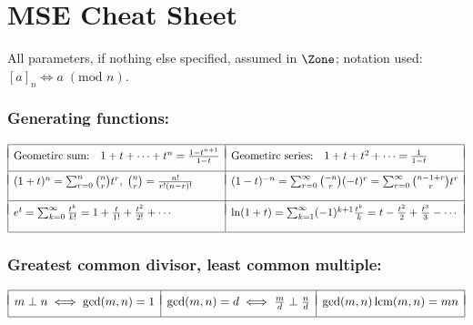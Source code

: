 \documentclass[a4paper]{article}
\begin{document}
\section*{MSE Cheat Sheet}

All parameters, if nothing else specified, assumed in $\Zone$;
notation used: $[a]_n \iff a\; (\mbox{mod } n)$.

\vspace{-10pt}

\subsubsection*{Generating functions:} \vspace{-1.2em}%
\[
  \begin{array}[t]{|ll|ll|}
    \hline
    &&& \\[-9pt]
    \mbox{Geometirc sum:} & 1+t+\cdots+t^n = \frac{1-t^{n+1}}{1-t} &
    \mbox{Geometirc series:} & 1+t+t^2+\cdots = \frac{1}{1-t}
    \\[7pt]\hline
    &&& \\[-9pt]
    \multicolumn{2}{|l|}{(1+t)^n = \sum_{r=0}^{n} \binom nr t^r, \; \binom nr = \frac{n!}{r!(n-r)!}} &
    \multicolumn{2}{l|}{(1-t)^{-n} = \sum_{r=0}^{\infty} \binom {-n}r (-t)^r = \sum_{r=0}^{\infty}\binom {n-1+r}r t^r}
    \\[11pt]\hline
    &&& \\[-9pt]
    \multicolumn{2}{|l|}{e^t = \sum_{k=0}^{\infty} \frac{t^k}{k!} =  1 + \frac{t}{1!} + \frac{t^2}{2!} + \cdots}&
    \multicolumn{2}{l|}{\ln(1+t) = \sum_{k=1}^{\infty}(-1)^{k+1}\frac{t^k}{k} =  t - \frac{t^2}{2} + \frac{t^3}{3} - \cdots}
    \\[11pt]\hline

  \end{array}
\]%

\subsubsection*{Greatest common divisor, least common multiple:} \vspace{-1.2em}%
\[
  \begin{array}[t]{|*{3}{l|}}
    \hline
    && \\[-8pt]
    m\perp n \iff \gcd(m,n)=1 & \gcd(m,n) = d \iff \frac md\perp\frac nd & \gcd(m,n)\,\mbox{lcm}(m,n) = mn
 \\[6pt] \hline
  \end{array}
\]%
\end{document}

